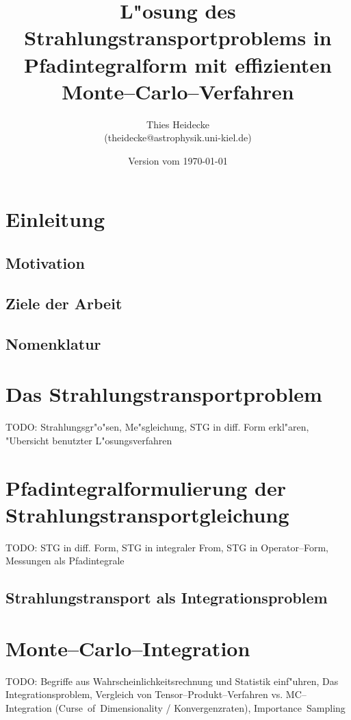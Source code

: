 \documentclass[11pt,a4paper]{scrartcl}
\begin{document}
	\titlehead{Christian--Albrechts--Universit"at Kiel\\ Institut f"ur Theoretische Physik und Astrophysik}
	\subject{Diplomarbeit}
	\title{L"osung des Strahlungstransportproblems in Pfadintegralform mit effizienten Monte--Carlo--Verfahren}
	\author{Thies Heidecke\\(theidecke@astrophysik.uni-kiel.de)}
	\date{Version vom \today}
	\publishers{betreut durch Prof. Sebastian Wolf}
	\maketitle
	
	\pagebreak
	
	\section{Einleitung}
	\subsection{Motivation}
	\subsection{Ziele der Arbeit}
	\subsection{Nomenklatur}
	
	\section{Das Strahlungstransportproblem}
	TODO: Strahlungsgr"o"sen, Me"sgleichung, STG in diff. Form erkl"aren, "Ubersicht benutzter L"osungsverfahren
	
	\section{Pfadintegralformulierung der Strahlungstransportgleichung}
	TODO: STG in diff. Form, STG in integraler From, STG in Operator--Form, Messungen als Pfadintegrale
	\subsection{Strahlungstransport als Integrationsproblem}
	\section{Monte--Carlo--Integration}
	TODO: Begriffe aus Wahrscheinlichkeitsrechnung und Statistik einf"uhren, Das Integrationsproblem, Vergleich von Tensor--Produkt--Verfahren vs. MC--Integration (Curse~of~Dimensionality / Konvergenzraten), Importance~Sampling
\end{document}
